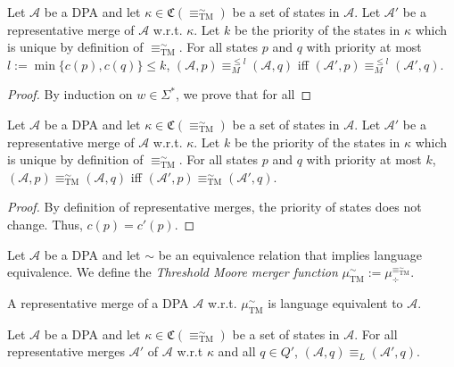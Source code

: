 \begin{lem}
	Let $\mathcal{A}$ be a DPA and let $\kappa \in \mathfrak{C}(\equiv^\sim_\text{TM})$ be a set of states in $\mathcal{A}$. Let $\mathcal{A}'$ be a representative merge of $\mathcal{A}$ w.r.t. $\kappa$. Let $k$ be the priority of the states in $\kappa$ which is unique by definition of $\equiv^\sim_\text{TM}$. For all states $p$ and $q$ with priority at most $l := \min \{c(p), c(q)\} \leq k$, $(\mathcal{A}, p) \equiv^{\leq l}_M (\mathcal{A}, q)$ iff $(\mathcal{A}', p) \equiv^{\leq l}_M (\mathcal{A}', q)$.
\end{lem}

\begin{proof}
	By induction on $w \in \Sigma^*$, we prove that for all 
\end{proof}




\begin{lem}
	Let $\mathcal{A}$ be a DPA and let $\kappa \in \mathfrak{C}(\equiv^\sim_\text{TM})$ be a set of states in $\mathcal{A}$. Let $\mathcal{A}'$ be a representative merge of $\mathcal{A}$ w.r.t. $\kappa$. Let $k$ be the priority of the states in $\kappa$ which is unique by definition of $\equiv^\sim_\text{TM}$. For all states $p$ and $q$ with priority at most $k$, $(\mathcal{A}, p) \equiv^\sim_\text{TM} (\mathcal{A}, q)$ iff $(\mathcal{A}', p) \equiv^\sim_\text{TM} (\mathcal{A}', q)$.
\end{lem}

\begin{proof}
	By definition of representative merges, the priority of states does not change. Thus, $c(p) = c'(p)$.
\end{proof}

\vspace{10pt}

\begin{defn}
	Let $\mathcal{A}$ be a DPA and let $\sim$ be an equivalence relation that implies language equivalence. We define the \emph{Threshold Moore merger function} $\mu_\text{TM}^\sim := \mu_\div^{\equiv^\sim_\text{TM}}$.
\end{defn}

\begin{theorem}
	A representative merge of a DPA $\mathcal{A}$ w.r.t. $\mu_\text{TM}^\sim$ is language equivalent to $\mathcal{A}$.
\end{theorem}

\newpage

\begin{lem}
	Let $\mathcal{A}$ be a DPA and let $\kappa \in \mathfrak{C}(\equiv^\sim_\text{TM})$ be a set of states in $\mathcal{A}$. For all representative merges $\mathcal{A}'$ of $\mathcal{A}$ w.r.t $\kappa$ and all $q \in Q'$, $(\mathcal{A}, q) \equiv_L (\mathcal{A}', q)$.
\end{lem}

